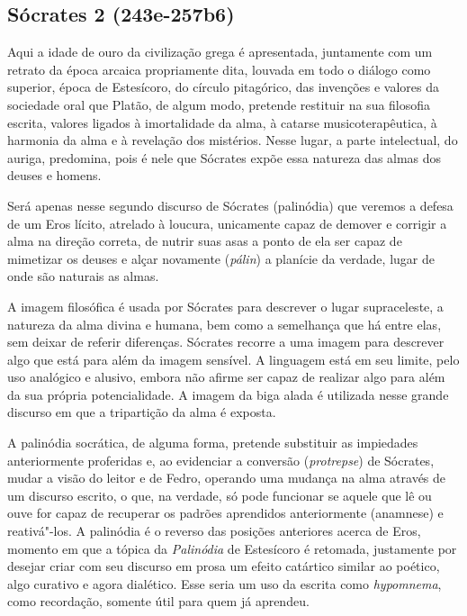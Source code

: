 \subsection{Sócrates 2 (243e-257b6)}

Aqui a idade de ouro da civilização
grega é apresentada, juntamente com um retrato da época arcaica
propriamente dita, louvada em todo o diálogo como superior, época de
Estesícoro, do círculo pitagórico, das invenções e valores da sociedade
oral que Platão, de algum modo, pretende restituir na sua filosofia
escrita, valores ligados à imortalidade da alma, à catarse
musicoterapêutica, à harmonia da alma e à revelação dos mistérios.
Nesse lugar, a parte intelectual, do auriga, predomina, pois é nele que
Sócrates expõe essa natureza das almas dos deuses e homens.

Será apenas nesse segundo discurso de Sócrates (palinódia) que
veremos a defesa de um Eros lícito, atrelado à loucura, unicamente capaz
de demover e corrigir a alma na direção correta, de nutrir suas asas a
ponto de ela ser capaz de mimetizar os deuses e alçar novamente
(\emph{pálin}) a planície da verdade, lugar de onde são naturais as
almas.

A imagem filosófica é usada por Sócrates para descrever o lugar
supraceleste, a natureza da alma divina e humana, bem como a semelhança
que há entre elas, sem deixar de referir diferenças. Sócrates recorre a
uma imagem para descrever algo que está para além da imagem sensível. 
A linguagem está em seu limite, pelo uso analógico e alusivo, embora não
afirme ser capaz de realizar algo para além da sua própria
potencialidade. A imagem da biga alada é utilizada nesse grande discurso
em que a tripartição da alma é exposta.

A palinódia socrática, de alguma forma, pretende substituir as
impiedades anteriormente proferidas e, ao evidenciar a conversão
(\emph{protrepse}) de Sócrates, mudar a visão do leitor e de Fedro, operando
uma mudança na alma através de um discurso escrito, o que, na verdade, só
pode funcionar se aquele que lê ou ouve for capaz de recuperar os
padrões aprendidos anteriormente (anamnese) e reativá"-los.
A palinódia é o reverso das posições anteriores acerca de Eros,
momento em que a tópica da \emph{Palinódia} de Estesícoro é retomada,
justamente por desejar criar com seu discurso em prosa um efeito
catártico similar ao poético, algo curativo e agora dialético. Esse
seria um uso da escrita como \emph{hypomnema}, como recordação, somente
útil para quem já aprendeu.

